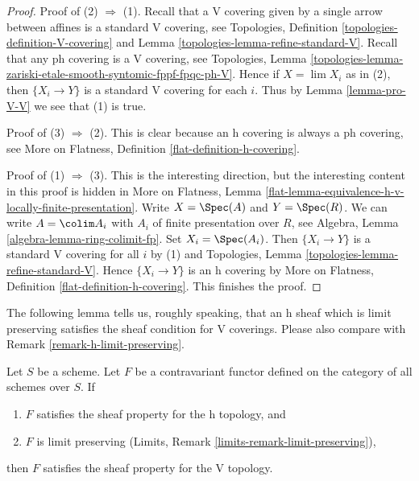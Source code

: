 \begin{proof}
Proof of (2) $\Rightarrow$ (1). Recall that a V covering given by a
single arrow between affines is a standard V covering, see
Topologies, Definition \ref{topologies-definition-V-covering} and
Lemma \ref{topologies-lemma-refine-standard-V}.
Recall that any ph covering is a V covering, see
Topologies, Lemma
\ref{topologies-lemma-zariski-etale-smooth-syntomic-fppf-fpqc-ph-V}.
Hence if $X = \lim X_i$ as in (2), then $\{X_i \to Y\}$
is a standard V covering for each $i$. Thus by
Lemma \ref{lemma-pro-V-V} we see that (1) is true.

\medskip\noindent
Proof of (3) $\Rightarrow$ (2). This is clear because an h covering
is always a ph covering, see
More on Flatness, Definition \ref{flat-definition-h-covering}.

\medskip\noindent
Proof of (1) $\Rightarrow$ (3). This is the interesting direction, but
the interesting content in this proof is hidden in More on Flatness, Lemma
\ref{flat-lemma-equivalence-h-v-locally-finite-presentation}.
Write $X = \Spec(A)$ and $Y = \Spec(R)$. We can write
$A = \colim A_i$ with $A_i$ of finite presentation over $R$, see
Algebra, Lemma \ref{algebra-lemma-ring-colimit-fp}.
Set $X_i = \Spec(A_i)$. Then $\{X_i \to Y\}$ is a standard V covering
for all $i$ by (1) and
Topologies, Lemma \ref{topologies-lemma-refine-standard-V}.
Hence $\{X_i \to Y\}$ is an h covering by
More on Flatness, Definition \ref{flat-definition-h-covering}.
This finishes the proof.
\end{proof}

\noindent
The following lemma tells us, roughly speaking, that an h sheaf
which is limit preserving satisfies the sheaf condition for V coverings.
Please also compare with Remark \ref{remark-h-limit-preserving}.

\begin{lemma}
\label{lemma-h-limit-preserving}
Let $S$ be a scheme. Let $F$ be a contravariant functor defined
on the category of all schemes over $S$. If
\begin{enumerate}
\item $F$ satisfies the sheaf property for the h topology, and
\item $F$ is limit preserving
(Limits, Remark \ref{limits-remark-limit-preserving}),
\end{enumerate}
then $F$ satisfies the sheaf property for the V topology.
\end{lemma}

